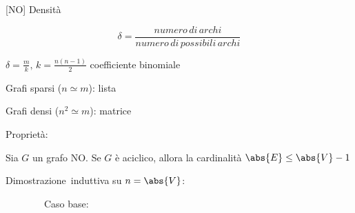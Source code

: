 \documentclass[11pt,a4paper,twoside,openright]{book}
\begin{document}
{{[}NO{]} Densità}

\begin{equation}
\delta=\frac{numero\,di\,archi}{numero\,di\,possibili\,archi}
\end{equation}

{$\delta=\frac{m}{k},\,k = \frac{n(n-1)}{2}$ coefficiente binomiale}


{Grafi sparsi ($n\simeq m$): lista}

{Grafi densi ($n^2\simeq m$): matrice}

{Proprietà:}

{Sia $G$ un grafo NO. Se $G$ è aciclico, allora la cardinalità $\abs{E} \leq \abs{V}-1$}

{Dimostrazione}{~induttiva su $n=\abs{V}$:}

{~~~~~~~~Caso base:}
\end{document}
